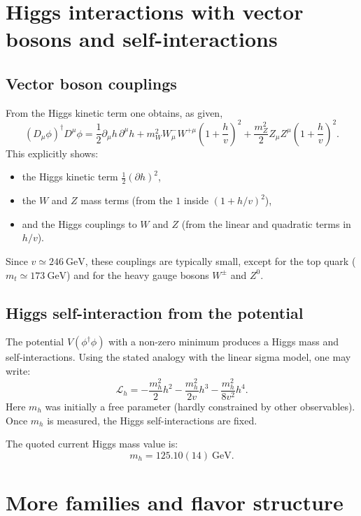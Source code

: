 \section{Higgs interactions with vector bosons and self-interactions}
\subsection{Vector boson couplings}
From the Higgs kinetic term one obtains, as given,
\begin{equation}
(D_\mu\phi)^\dagger D^\mu\phi
=
\frac{1}{2}\partial_\mu h\,\partial^\mu h
+m_W^2 W^-_\mu W^{+\mu}\left(1+\frac{h}{v}\right)^2
+\frac{m_Z^2}{2}Z_\mu Z^\mu\left(1+\frac{h}{v}\right)^2.
\end{equation}
This explicitly shows:
\begin{itemize}
  \item the Higgs kinetic term $\frac{1}{2}(\partial h)^2$,
  \item the $W$ and $Z$ mass terms (from the $1$ inside $(1+h/v)^2$),
  \item and the Higgs couplings to $W$ and $Z$ (from the linear and quadratic terms in $h/v$).
\end{itemize}
Since $v\simeq 246~\mathrm{GeV}$, these couplings are typically small, except for the top quark ($m_t\simeq 173~\mathrm{GeV}$) and for the heavy gauge bosons $W^\pm$ and $Z^0$.

\subsection{Higgs self-interaction from the potential}
The potential $V(\phi^\dagger\phi)$ with a non-zero minimum produces a Higgs mass and self-interactions.
Using the stated analogy with the linear sigma model, one may write:
\begin{equation}
\boxed{
\mathcal L_h
=
-\frac{m_h^2}{2}h^2
-\frac{m_h^2}{2v}h^3
-\frac{m_h^2}{8v^2}h^4.
}
\label{eq:Higgs-self}
\end{equation}
Here $m_h$ was initially a free parameter (hardly constrained by other observables).
Once $m_h$ is measured, the Higgs self-interactions are fixed.

The quoted current Higgs mass value is:
\begin{equation}
m_h=125.10(14)~\mathrm{GeV}.
\end{equation}

\section{More families and flavor structure}
